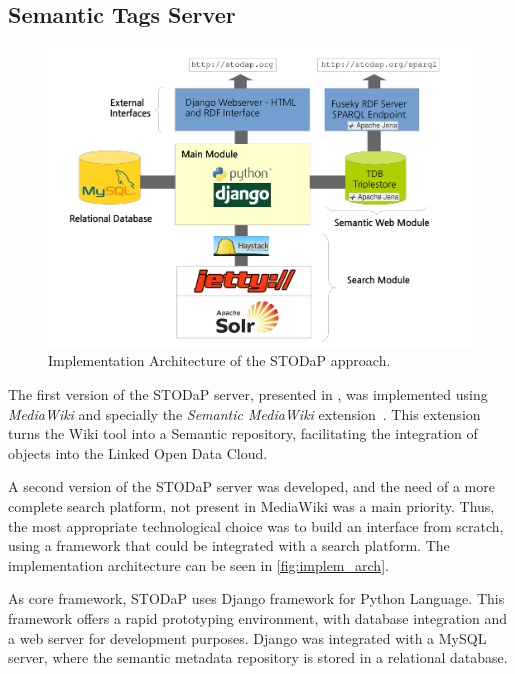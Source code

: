 \subsection{Semantic Tags Server}
\label{sec:implem_semtagserver}

\begin{figure}[t]
\begin{center}
\includegraphics[width=\columnwidth]{images/implementation_architecture.pdf}
\caption[Implementation Architecture of the STODaP approach.]{Implementation Architecture of the STODaP approach.}
\label{fig:implem_arch}
\end{center}
\end{figure}

The first version of the STODaP server, presented in , was implemented using \emph{MediaWiki} and specially the \emph{Semantic MediaWiki} extension~\cite{Kroetzsch2007}.
This extension turns the Wiki tool into a Semantic repository, facilitating the integration of objects into the Linked Open Data Cloud.

A second version of the STODaP server was developed, and the need of a more complete search platform, not present in MediaWiki was a main priority.
Thus, the most appropriate technological choice was to build an interface from scratch, using a framework that could be integrated with a search platform.
The implementation architecture can be seen in \autoref{fig:implem_arch}.

As core framework, STODaP uses Django framework for Python Language.
This framework offers a rapid prototyping environment, with database integration and a web server for development purposes.
Django was integrated with a MySQL server, where the semantic metadata repository is stored in a relational database.

